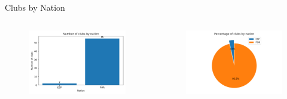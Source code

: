 \documentclass[aspectratio=169, xcolor=dvipsnames]{beamer}
\begin{document}
\begin{frame}{Clubs by Nation}
\begin{columns}[c]
\begin{column}{.45\textwidth}
\begin{figure}
    \centering
    \includegraphics[width=\textwidth]{img/clubsbynation.png}
\end{figure}
\end{column}

\begin{column}{.55\textwidth}
\begin{figure}
    \centering
    \includegraphics[width=\textwidth]{img/clubsbynation-pie.png}
\end{figure}
\end{column}
\end{columns}
\end{frame}
\end{document}
